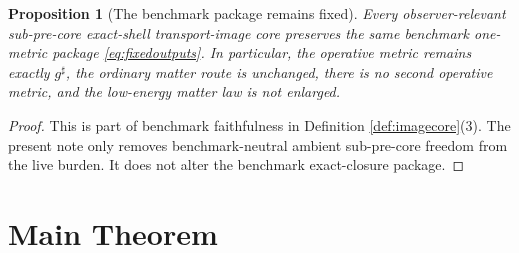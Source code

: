 \documentclass[11pt]{article}
\newcommand{\CompletedMetric}{g^{\sharp}}
\newtheorem{proposition}{Proposition}
\begin{document}
\begin{proposition}[The benchmark package remains fixed]
\label{prop:benchmark}
Every observer-relevant sub-pre-core exact-shell transport-image core preserves the same benchmark one-metric package \eqref{eq:fixedoutputs}. In particular, the operative metric remains exactly \(\CompletedMetric\), the ordinary matter route is unchanged, there is no second operative metric, and the low-energy matter law is not enlarged.
\end{proposition}

\begin{proof}
This is part of benchmark faithfulness in Definition \ref{def:imagecore}(3). The present note only removes benchmark-neutral ambient sub-pre-core freedom from the live burden. It does not alter the benchmark exact-closure package.
\end{proof}

\section{Main Theorem}
\end{document}
